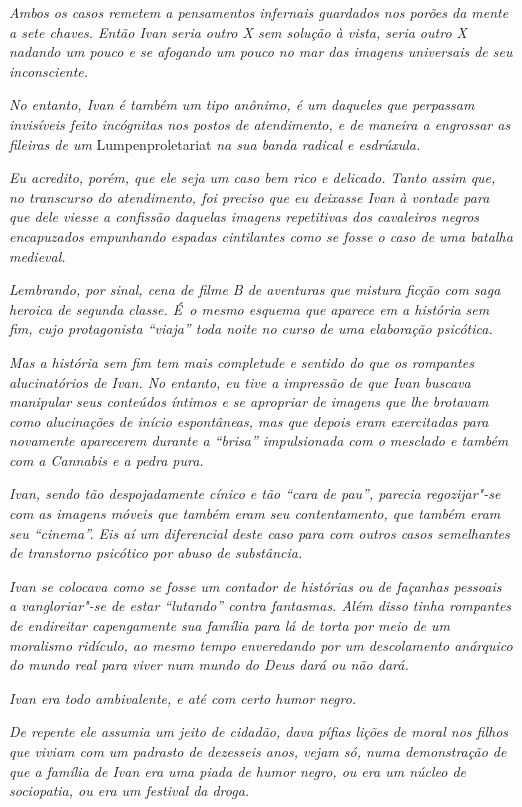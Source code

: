 \emph{Ambos os casos remetem a pensamentos infernais guardados nos
porões da mente a sete chaves. Então Ivan seria outro X sem solução à
vista, seria outro X nadando um pouco e se afogando um pouco no mar das
imagens universais de seu inconsciente.}~

\emph{No entanto, Ivan é também um tipo anônimo, é um daqueles que
perpassam invisíveis feito incógnitas nos postos de atendimento, e de
maneira a engrossar as fileiras de um} Lumpenproletariat \emph{na sua banda
radical e esdrúxula.}~

\emph{Eu acredito, porém, que ele seja um caso bem rico e delicado.
Tanto assim que, no transcurso do atendimento, foi preciso que eu
deixasse Ivan à vontade para que dele viesse a confissão daquelas
imagens repetitivas dos cavaleiros negros encapuzados empunhando espadas
cintilantes como se fosse o caso de uma batalha medieval.}~

\emph{Lembrando, por sinal, cena de filme B de aventuras que mistura
ficção com saga heroica de segunda classe. É~o mesmo esquema que aparece
em a história sem fim, cujo protagonista ``viaja'' toda noite no curso de
uma elaboração psicótica.}~

\emph{Mas a história sem fim tem mais completude e sentido do que os
rompantes alucinatórios de Ivan. No entanto, eu tive a impressão de que
Ivan buscava manipular seus conteúdos íntimos e se apropriar de imagens
que lhe brotavam como alucinações de início espontâneas, mas que depois
eram exercitadas para novamente aparecerem durante a ``brisa''
impulsionada com o mesclado e também com a Cannabis e a pedra pura.}~

\emph{Ivan, sendo tão despojadamente cínico e tão ``cara de pau'',
parecia regozijar"-se com as imagens móveis que também eram seu
contentamento, que também eram seu ``cinema''. Eis aí um diferencial
deste caso para com outros casos semelhantes de transtorno psicótico por
abuso de substância.}~

\emph{Ivan se colocava como se fosse um contador de histórias ou de
façanhas pessoais a vangloriar"-se de estar ``lutando'' contra fantasmas.
Além disso tinha rompantes de endireitar capengamente sua família para
lá de torta por meio de um moralismo ridículo, ao mesmo tempo
enveredando por um descolamento anárquico do mundo real para viver num
mundo do Deus dará ou não dará.}~

\emph{Ivan era todo ambivalente, e até com certo humor negro.}~

\emph{De repente ele assumia um jeito de cidadão, dava pífias lições de
moral nos filhos que viviam com um padrasto de dezesseis anos, vejam só,
numa demonstração de que a família de Ivan era uma piada de humor negro,
ou era um núcleo de sociopatia, ou era um festival da droga.}~

